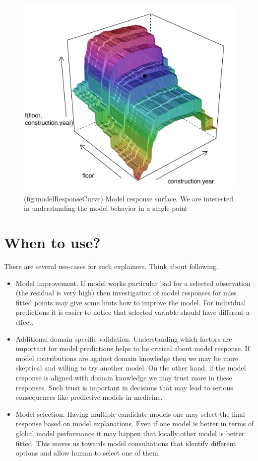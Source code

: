\documentclass[]{book}
\providecommand{\tightlist}{%
  \setlength{\itemsep}{0pt}\setlength{\parskip}{0pt}}
\theoremstyle{definition}
\theoremstyle{definition}
\theoremstyle{definition}
\theoremstyle{remark}
\begin{document}
\begin{figure}
\includegraphics[width=0.7\linewidth]{figure/model_response} \caption{(fig:modelResponseCurve) Model response surface. We are interested in understanding the model behavior in a single point}\label{fig:modelResponseCurve}
\end{figure}

\hypertarget{when-to-use}{%
\section{When to use?}\label{when-to-use}}

There are several use-cases for such explainers. Think about following.

\begin{itemize}
\tightlist
\item
  Model improvement. If model works particular bad for a selected
  observation (the residual is very high) then investigation of model
  responses for miss fitted points may give some hints how to improve
  the model. For individual predictions it is easier to notice that
  selected variable should have different a effect.
\item
  Additional domain specific validation. Understanding which factors are
  important for model predictions helps to be critical about model
  response. If model contributions are against domain knowledge then we
  may be more skeptical and willing to try another model. On the other
  hand, if the model response is aligned with domain knowledge we may
  trust more in these responses. Such trust is important in decisions
  that may lead to serious consequences like predictive models in
  medicine.
\item
  Model selection. Having multiple candidate models one may select the
  final response based on model explanations. Even if one model is
  better in terms of global model performance it may happen that locally
  other model is better fitted. This moves us towards model
  consultations that identify different options and allow human to
  select one of them.
\end{itemize}
\end{document}
